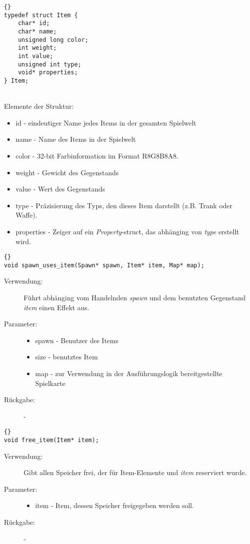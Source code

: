 \documentclass[11pt,a4paper,notitlepage]{report}
\begin{document}
	\begin{lstlisting}[caption=Item]{}
typedef struct Item {
	char* id;
	char* name;
	unsigned long color;
	int weight;
	int value;
	unsigned int type;
	void* properties;
} Item;
		\end{lstlisting} \hspace*{\fill} \\
Elemente der Struktur:
		\begin{itemize}
			\item id - eindeutiger Name jedes Items in der gesamten Spielwelt
			\item name - Name des Items in der Spielwelt
			\item color - 32-bit Farbinformation im Format R8G8B8A8.
			\item weight - Gewicht des Gegenstands
			\item value - Wert des Gegenstands
			\item type - Präzisierung des Typs, den dieses Item darstellt (z.B. Trank oder Waffe).
			\item properties - Zeiger auf ein \textit{Property}-struct, das abhänging von \textit{type} erstellt wird.
		\end{itemize}
		
		\begin{lstlisting}[caption=spawn\_uses\_item]{}
void spawn_uses_item(Spawn* spawn, Item* item, Map* map);
		\end{lstlisting}
		
	\begin{description}
		\item[Verwendung:] Führt abhänging vom Handelnden \textit{spawn} und dem benutzten Gegenstand \textit{item} einen Effekt aus.
		\item[Parameter:] \hfill
		\begin{itemize}
			\item spawn - Benutzer des Items
			\item size - benutztes Item
			\item map - zur Verwendung in der Ausführungslogik bereitgestellte Spielkarte
		\end{itemize}
		\item[Rückgabe:] -
	\end{description}
	
		\begin{lstlisting}[caption=free\_item]{}
void free_item(Item* item);
		\end{lstlisting}
		
	\begin{description}
		\item[Verwendung:] Gibt allen Speicher frei, der für Item-Elemente und \textit{item} reserviert wurde.
		\item[Parameter:] \hfill
		\begin{itemize}
			\item item - Item, dessen Speicher freigegeben werden soll.
		\end{itemize}
		\item[Rückgabe:] -
	\end{description}
	
\end{document}
